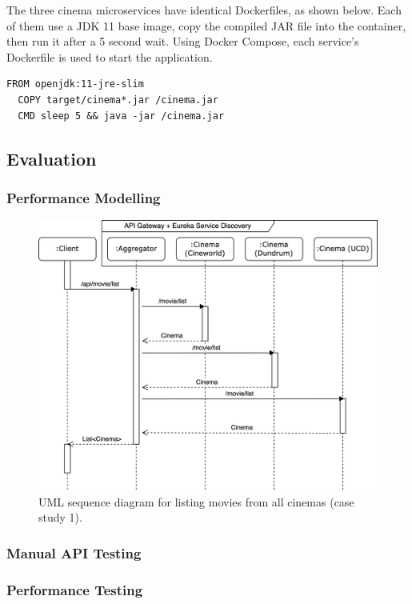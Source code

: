 The three cinema microservices have identical Dockerfiles, as shown below. Each of them use a JDK 11 base image, copy the compiled JAR file into the container, then run it after a 5 second wait. Using Docker Compose, each service's Dockerfile is used to start the application.

\begin{lstlisting}[caption=Dockerfile for cinema services]
  FROM openjdk:11-jre-slim
  COPY target/cinema*.jar /cinema.jar
  CMD sleep 5 && java -jar /cinema.jar
\end{lstlisting}


\subsection{Evaluation}

\subsubsection{Performance Modelling}

\begin{figure}[H]
  \centering
  \includegraphics[width=0.75\linewidth]{./assets/diagrams/cs01-sequence.png}
  \caption{UML sequence diagram for listing movies from all cinemas (case study 1).}
  \label{fig:cs01-sequence}
\end{figure}

\subsubsection{Manual API Testing}
\subsubsection{Performance Testing}
